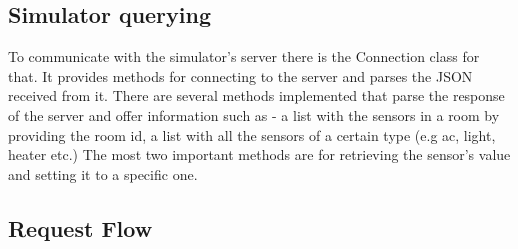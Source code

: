 \subsection{Simulator querying}
To communicate with the simulator's server there is the Connection class for that. It provides methods for connecting to the server and parses the JSON received from it. There are several methods implemented that parse the response of the server and offer information such as - a list with the sensors in a room by providing the room id, a list with all the sensors of a certain type (e.g ac, light, heater etc.) The most two important methods are for retrieving the sensor's value and setting it to a specific one. 
\subsection{Request Flow}